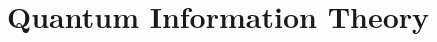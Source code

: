 \documentclass[12pt]{report}
\title{\sc{Title's name}}
\author{Author's name}
\date{\today}
\numberwithin{theorem}{section}
\numberwithin{corollary}{section}
\numberwithin{proposition}{section}
\numberwithin{definition}{section}
\begin{document}
\maketitle\newpage
{}
\dominitoc
\tableofcontents
\clearpage
\setcounter{page}{1}
\part{Quantum Information Theory}

\end{document}
